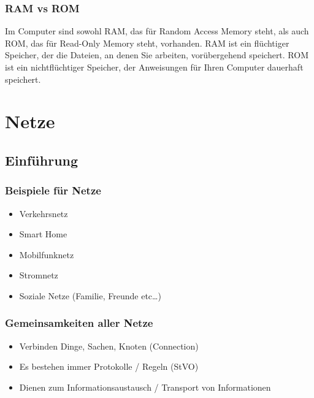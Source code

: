 \documentclass[12pt,a4paper]{article}
\begin{document}
\subsubsection{RAM vs ROM}
    Im Computer sind sowohl RAM, das für Random Access Memory steht, als auch ROM, das für Read-Only Memory steht, vorhanden. RAM ist ein flüchtiger Speicher, der die Dateien, an denen Sie arbeiten, vorübergehend speichert. ROM ist ein nichtflüchtiger Speicher, der Anweisungen für Ihren Computer dauerhaft speichert.
	
\section{Netze}
	\subsection{Einführung}
		\subsubsection{Beispiele für Netze}
			\begin{itemize}
				\item Verkehrsnetz
				\item Smart Home
				\item Mobilfunknetz
				\item Stromnetz
				\item Soziale Netze (Familie, Freunde etc\dots)
			\end{itemize}
			
\subsubsection{Gemeinsamkeiten aller Netze}
	\begin{itemize}
		\item Verbinden Dinge, Sachen, Knoten (Connection)
		\item Es bestehen immer Protokolle / Regeln (StVO)
		\item Dienen zum Informationsaustausch / Transport von Informationen
	\end{itemize}
\end{document}
